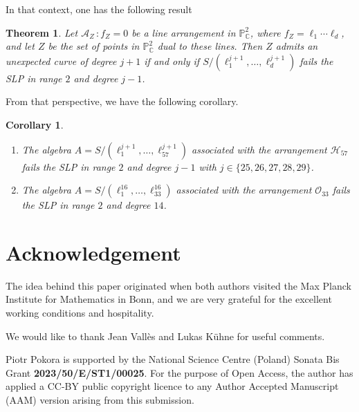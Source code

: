 \documentclass[11pt]{article}
\theoremstyle{plain}
\newtheorem{theorem}[thm]{Theorem}
\newtheorem{corollary}[thm]{Corollary}
\theoremstyle{definition}
\theoremstyle{plain}
\begin{document}
In that context, one has the following result \cite[Theorem 7.5]{Cook} 

\begin{theorem}
Let $\mathcal{A}_{Z} \, :  f_{Z}=0$ be a line arrangement in $\mathbb{P}^{2}_{\mathbb{C}}$, where $f_{Z} = \ell_{1} \cdots \ell_{d}$, and let $Z$ be the set of points in $\mathbb{P}^{2}_{\mathbb{C}}$ dual to these lines. Then $Z$ admits an unexpected curve of degree $j+1$ if and only if $S/(\ell_{1}^{j+1}, \ldots, \ell_{d}^{j+1})$ fails the SLP in range $2$ and degree $j-1$.
\end{theorem}
From that perspective, we have the following corollary.
\begin{corollary}
\begin{enumerate}
\item[a)] The algebra $A = S/(\ell_{1}^{j+1}, \ldots , \ell_{57}^{j+1})$ associated with the arrangement $\mathcal{H}_{57}$ fails the SLP in range $2$ and degree $j-1$ with $j \in \{25,26,27,28,29\}$.
\item[b)] The algebra $A = S/(\ell_{1}^{16}, \ldots , \ell_{33}^{16})$ associated with the arrangement $\mathcal{O}_{33}$ fails the SLP in range $2$ and degree $14$.
\end{enumerate}
\end{corollary}


\section*{Acknowledgement}
The idea behind this paper originated when both authors visited the Max Planck Institute for Mathematics in Bonn, and we are very grateful for the excellent working conditions and hospitality.

We would like to thank Jean Vall\`es and Lukas K\"uhne for useful comments.

Piotr Pokora is supported by the National Science Centre (Poland) Sonata Bis Grant  \textbf{2023/50/E/ST1/00025}. For the purpose of Open Access, the author has applied a CC-BY public copyright licence to any Author Accepted Manuscript (AAM) version arising from this submission.
\end{document}
